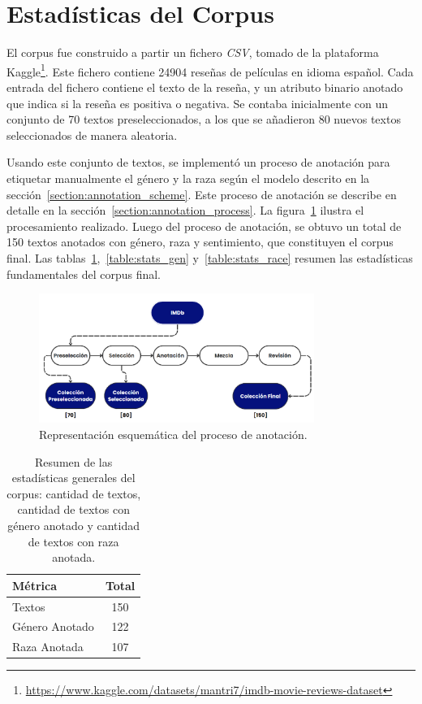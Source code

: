 \section{Estad\'isticas del Corpus}\label{section:corpus_stats}
El corpus fue construido a partir un fichero \emph{CSV}, tomado de la plataforma 
Kaggle\footnote{\url{https://www.kaggle.com/datasets/mantri7/imdb-movie-reviews-dataset}}. 
Este fichero contiene 24904 rese\~nas de pel\'iculas en idioma espa\~nol. Cada entrada del fichero contiene el texto de la rese\~na, 
y un atributo binario anotado que indica si la rese\~na es positiva o negativa. Se contaba inicialmente con un conjunto de 70 textos 
preseleccionados, a los que se a\~nadieron 80 nuevos textos seleccionados de manera aleatoria.

Usando este conjunto de textos, se implement\'o un proceso de anotaci\'on para etiquetar manualmente el g\'enero y la raza seg\'un 
el modelo descrito en la secci\'on~\ref{section:annotation_scheme}. Este proceso de anotaci\'on se describe en detalle en la 
secci\'on~\ref{section:annotation_process}. La figura~\ref{fig:ann_proc} ilustra el procesamiento realizado.
Luego del proceso de anotaci\'on, se obtuvo un total de 150 textos anotados con g\'enero, raza y sentimiento, que constituyen el 
corpus final. Las tablas~\ref{table:stats},~\ref{table:stats_gen} y~\ref{table:stats_race}  resumen las estad\'isticas fundamentales 
del corpus final.

\begin{figure}[htpb]
    \begin{center}
        \includegraphics[width=0.8\textwidth]{Graphics/annotation_proc.png}
    \end{center}
    \caption{Representaci\'on esquem\'atica del proceso de anotaci\'on.}
    \label{fig:ann_proc}
\end{figure}

\begin{table}[htpb]
    \centering
        \begin{tabular}{lc}
        \toprule
        \textbf{M\'etrica} & \textbf{Total} \\
        \midrule
                    Textos & 150 \\
          G\'enero Anotado & 122 \\
              Raza Anotada & 107 \\

        \bottomrule
        \end{tabular}
    \caption{Resumen de las estad\'isticas generales del corpus: cantidad de textos, cantidad de textos con g\'enero anotado y 
    cantidad de textos con raza anotada.}
    \label{table:stats}
\end{table}

